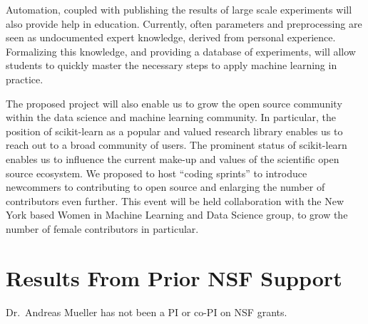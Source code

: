 Automation, coupled with publishing the results of large scale experiments will
also provide help in education. Currently, often parameters and
preprocessing are seen as undocumented expert knowledge, derived from personal experience.
Formalizing this knowledge, and providing a database of experiments,
will allow students to quickly master the necessary steps to apply
machine learning in practice.

The proposed project will also enable us to grow the open source community
within the data science and machine learning community.
In particular, the position of scikit-learn as a popular and valued
research library enables us to reach out to a broad community of users.
The prominent status of scikit-learn enables us to influence
the current make-up and values of the scientific open source ecosystem.
We proposed to host ``coding sprints'' to introduce
newcommers to contributing to open source and enlarging the
number of contributors even further. This event will be held collaboration with
the New York based Women in Machine Learning and Data Science group, to grow
the number of female contributors in particular. 


\section{Results From Prior NSF Support}
Dr.\ Andreas Mueller has not been a PI or co-PI on NSF grants.


